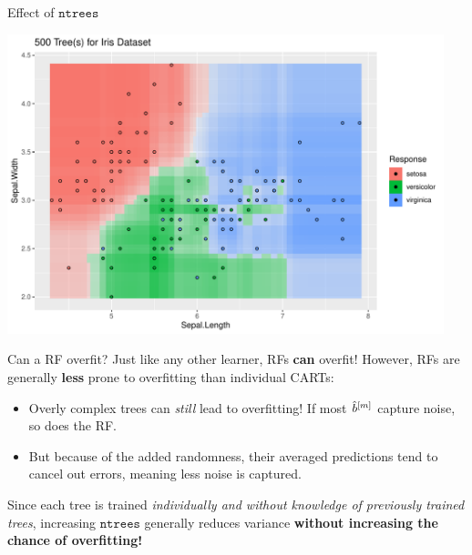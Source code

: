 \documentclass[11pt,compress,t,notes=noshow, xcolor=table]{beamer}
\begin{document}
\begin{vbframe}{Effect of $\texttt{ntrees}$}
\begin{knitrout}
{\centering \includegraphics[width=0.95\textwidth]{figure/cart_forest_intro_3} 

}
\end{knitrout}
\end{vbframe}

\begin{vbframe}{Can a RF overfit?}
Just like any other learner, RFs \textbf{can} overfit! However, RFs are generally \textbf{less} prone to overfitting than individual CARTs:
\begin{itemize}
  \item Overly complex trees can \textit{still} lead to overfitting! If most $\hat{b}^{[m]}$ capture noise, so does the RF.
  \item But because of the added randomness, their averaged predictions tend to cancel out errors, meaning less noise is captured.
\end{itemize}
Since each tree is trained \textit{individually and without knowledge of previously trained trees}, increasing $\texttt{ntrees}$ generally reduces variance \textbf{without increasing the chance of overfitting!} 
\end{vbframe}
\end{document}
